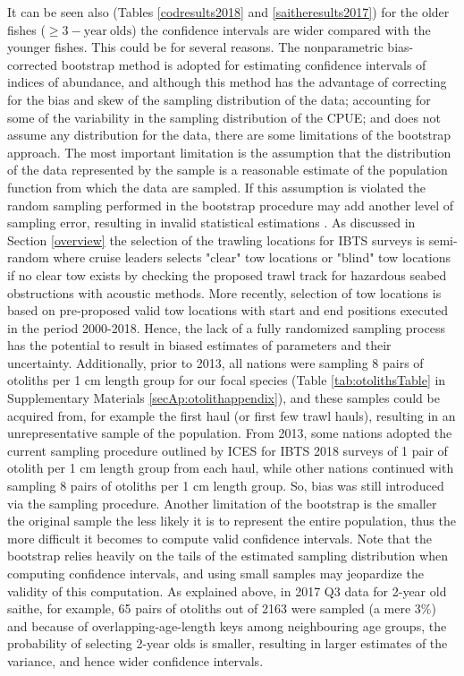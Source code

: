 \documentclass[a4paper 12pt]{article}
\numberwithin{equation}{section}
\begin{document}
It can be seen also (Tables \ref{codresults2018} and \ref{saitheresults2017}) for the older fishes ($\geq 3-\mathrm{year \ olds}$) the confidence intervals are wider compared with the younger fishes. This could be for several reasons. The nonparametric bias-corrected bootstrap method is adopted for estimating confidence intervals of indices of abundance, and although this method has the advantage of correcting for the bias and skew of the sampling distribution of the data; accounting for some of the variability in the sampling distribution of the CPUE;  and does not assume any distribution for the data, there are some limitations of the bootstrap approach. The most important limitation is the assumption that the distribution of the data represented by the sample is a reasonable estimate of the population function from which the data are sampled. If this assumption is violated the random sampling  performed in the bootstrap procedure may add another level of sampling error, resulting in invalid statistical estimations \citep{haukoos2005advanced}. As discussed in Section \ref{overview} the selection of the trawling locations for IBTS surveys is semi-random where cruise leaders selects "clear" tow locations or "blind" tow locations if no clear tow exists by checking the proposed trawl track for hazardous seabed obstructions with acoustic methods. More recently, selection of tow locations is based on pre-proposed valid tow locations with start and end positions executed in the period 2000-2018. Hence, the lack of a fully randomized sampling process has the potential to result in biased estimates of parameters and their uncertainty. Additionally, prior to 2013, all nations were sampling 8 pairs of otoliths per 1 cm length group for our focal species (Table \ref{tab:otolithsTable} in Supplementary Materials \ref{secAp:otolithappendix}), and these samples could be acquired from, for example the first haul (or first few trawl hauls), resulting in an unrepresentative sample of the population. From 2013, some nations adopted the current sampling procedure outlined by ICES for IBTS 2018 surveys of 1 pair of otolith per 1 cm length group from each haul, while other nations continued with sampling 8 pairs of otoliths per 1 cm length group. So, bias was still introduced via the sampling  procedure. Another limitation of the bootstrap is the smaller the original sample the less likely it is to represent the entire population, thus the more difficult it becomes to compute valid confidence intervals. Note that the bootstrap relies heavily on the tails of the estimated sampling distribution when computing
confidence intervals, and using small samples may jeopardize the validity of this computation. As explained above, in 2017 Q3 data for 2-year old saithe, for example, 65 pairs of otoliths out of 2163 were sampled (a mere 3\%) and because of overlapping-age-length keys among neighbouring age groups, the probability of selecting 2-year olds is smaller, resulting in larger estimates of the variance, and hence wider confidence intervals. 
\end{document}
